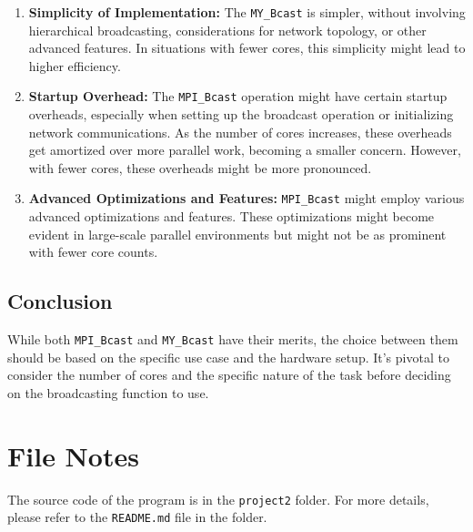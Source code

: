 \documentclass[12pt,a4paper]{article}
\begin{document}
\begin{enumerate}
    \item \textbf{Simplicity of Implementation:} The \texttt{MY\_Bcast} is simpler, without involving hierarchical broadcasting, considerations for network topology, or other advanced features. In situations with fewer cores, this simplicity might lead to higher efficiency.
    
    \item \textbf{Startup Overhead:} The \texttt{MPI\_Bcast} operation might have certain startup overheads, especially when setting up the broadcast operation or initializing network communications. As the number of cores increases, these overheads get amortized over more parallel work, becoming a smaller concern. However, with fewer cores, these overheads might be more pronounced.
    
    \item \textbf{Advanced Optimizations and Features:} \texttt{MPI\_Bcast} might employ various advanced optimizations and features. These optimizations might become evident in large-scale parallel environments but might not be as prominent with fewer core counts.
\end{enumerate}

\subsection{Conclusion}
While both \texttt{MPI\_Bcast} and \texttt{MY\_Bcast} have their merits, the choice between them should be based on the specific use case and the hardware setup. It's pivotal to consider the number of cores and the specific nature of the task before deciding on the broadcasting function to use.
\section*{File Notes}
The source code of the program is in the \texttt{project2} folder. 
For more details, please refer to the \texttt{README.md} file in the folder.
\end{document}
